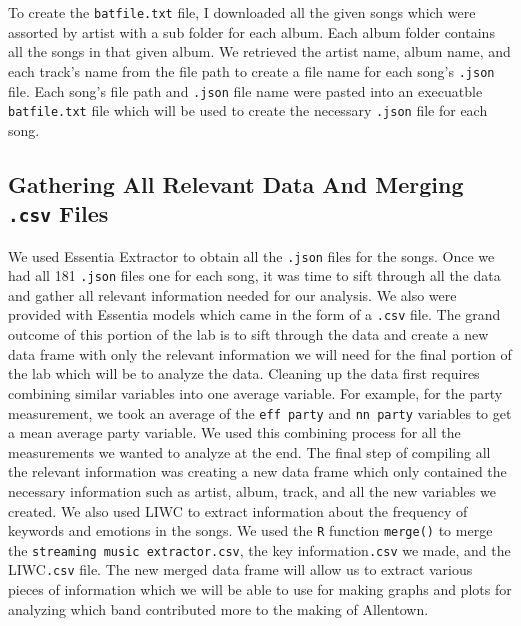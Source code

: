 \documentclass{article}\usepackage[]{graphicx}\usepackage[]{xcolor}
\begin{document}
\begin{multicols}{2}
To create the \texttt{batfile.txt} file, I downloaded all the given songs which were assorted by artist with a sub folder for each album. Each album folder contains all the songs in that given album. We retrieved the artist name, album name, and each track's name from the file path to create a file name for each song's \texttt{.json} file. Each song's file path and \texttt{.json} file name were pasted into an execuatble \texttt{batfile.txt} file which will be used to create the necessary \texttt{.json} file for each song.

\subsection{Gathering All Relevant Data And Merging \texttt{.csv} Files}
We used Essentia Extractor \citep{essentia} to obtain all the \texttt{.json} files for the songs. Once we had all 181 \texttt{.json} files one for each song, it was time to sift through all the data and gather all relevant information needed for our analysis. We also were provided with Essentia models \citep{essentiamodels} which came in the form of a \texttt{.csv} file. The grand outcome of this portion of the lab is to sift through the data and create a new data frame with only the relevant information we will need for the final portion of the lab which will be to analyze the data. Cleaning up the data first requires combining similar variables into one average variable. For example, for the party measurement, we took an average of the \texttt{eff party} and \texttt{nn party} variables to get a mean average party variable. We used this combining process for all the measurements we wanted to analyze at the end. The final step of compiling all the relevant information was creating a new data frame which only contained the necessary information such as artist, album, track, and all the new variables we created. We also used LIWC \citep{LIWC} to extract information about the frequency of keywords and emotions in the songs. We used the \texttt{R} function \texttt{merge()} to merge the \texttt{streaming music extractor}\texttt{.csv}, the key information\texttt{.csv} we made, and the LIWC\texttt{.csv} file. The new merged data frame will allow us to extract various pieces of information which we will be able to use for making graphs and plots for analyzing which band contributed more to the making of Allentown.


\end{multicols}
\end{document}
